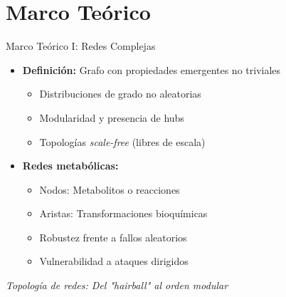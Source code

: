 \documentclass[aspectratio=169, 11pt]{beamer}
\begin{document}
	\section{Marco Teórico}
	\begin{frame}{Marco Teórico I: Redes Complejas}
		\begin{itemize}
			\item \textbf{Definición:} Grafo con propiedades emergentes no triviales
			\begin{itemize}
				\item Distribuciones de grado no aleatorias
				\item Modularidad y presencia de hubs
				\item Topologías \textit{scale-free} (libres de escala)
			\end{itemize}
			
			\vspace{0.2cm}
			\item \textbf{Redes metabólicas:}
			\begin{itemize}
				\item Nodos: Metabolitos o reacciones
				\item Aristas: Transformaciones bioquímicas
				\item Robustez frente a fallos aleatorios
				\item Vulnerabilidad a ataques dirigidos
			\end{itemize}
		\end{itemize}
		
		\vspace{0.3cm}
		\centering
		\footnotesize \textit{Topología de redes: Del "hairball" al orden modular}
	\end{frame}
	
\end{document}
